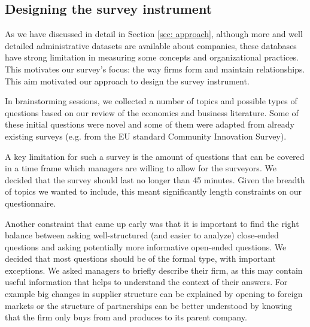 \documentclass[final, dvipsnames, authoryear,12pt]{elsarticle}
\begin{document}


\subsection{Designing the survey instrument}

As we have discussed in detail in Section \ref{sec: approach}, although more and well detailed administrative datasets are available about companies, these databases have strong limitation in measuring some concepts and organizational practices. This motivates our survey's focus: the way firms form and maintain relationships. This aim motivated our approach to design the survey instrument.

In brainstorming sessions, we collected a number of topics and possible types of questions based on our review of the economics and business literature. Some of these initial questions were novel and some of them were adapted from already existing surveys (e.g. from the EU standard Community Innovation Survey). 

A key limitation for such a survey is the amount of questions that can be covered in a time frame which managers are willing to allow for the surveyors. We decided that the survey should last no longer than 45 minutes. Given the breadth of topics we wanted to include, this meant significantly length constraints on our questionnaire. 

Another constraint that came up early was that it is important to find the right balance between asking well-structured (and easier to analyze) close-ended questions and asking potentially more informative open-ended questions. We decided that most questions should be of the formal type, with important exceptions. We asked managers to briefly describe their firm, as this may contain useful information that helps to understand the context of their answers. For example big changes in supplier structure can be explained by opening to foreign markets or the structure of partnerships can be better understood by knowing that the firm only buys from and produces to its parent company.

\end{document}

